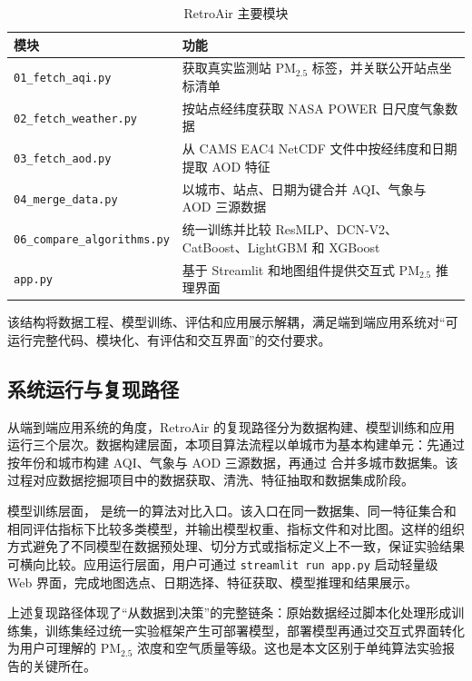 \documentclass[UTF8,zihao=-4,a4paper]{ctexart}
\newcommand{\pmfine}{PM$_{2.5}$}
\newcommand{\aod}{AOD}
\begin{document}
\begin{table}[H]
  \centering
  \caption{RetroAir 主要模块}
  \label{tab:modules}
  \begin{tabularx}{\textwidth}{lX}
    \toprule
    模块 & 功能 \\
    \midrule
    \texttt{01\_fetch\_aqi.py} & 获取真实监测站 \pmfine{} 标签，并关联公开站点坐标清单 \\
    \texttt{02\_fetch\_weather.py} & 按站点经纬度获取 NASA POWER 日尺度气象数据 \\
    \texttt{03\_fetch\_aod.py} & 从 CAMS EAC4 NetCDF 文件中按经纬度和日期提取 \aod{} 特征 \\
    \texttt{04\_merge\_data.py} & 以城市、站点、日期为键合并 AQI、气象与 \aod{} 三源数据 \\
    \texttt{06\_compare\_algorithms.py} & 统一训练并比较 ResMLP、DCN-V2、CatBoost、LightGBM 和 XGBoost \\
    \texttt{app.py} & 基于 Streamlit 和地图组件提供交互式 \pmfine{} 推理界面 \\
    \bottomrule
  \end{tabularx}
\end{table}

该结构将数据工程、模型训练、评估和应用展示解耦，满足端到端应用系统对“可运行完整代码、模块化、有评估和交互界面”的交付要求。

\subsection{系统运行与复现路径}

从端到端应用系统的角度，RetroAir 的复现路径分为数据构建、模型训练和应用运行三个层次。数据构建层面，本项目算法流程以单城市为基本构建单元：先通过  按年份和城市构建 AQI、气象与 \aod{} 三源数据，再通过  合并多城市数据集。该过程对应数据挖掘项目中的数据获取、清洗、特征抽取和数据集成阶段。

模型训练层面， 是统一的算法对比入口。该入口在同一数据集、同一特征集合和相同评估指标下比较多类模型，并输出模型权重、指标文件和对比图。这样的组织方式避免了不同模型在数据预处理、切分方式或指标定义上不一致，保证实验结果可横向比较。应用运行层面，用户可通过 \texttt{streamlit run app.py} 启动轻量级 Web 界面，完成地图选点、日期选择、特征获取、模型推理和结果展示。

上述复现路径体现了“从数据到决策”的完整链条：原始数据经过脚本化处理形成训练集，训练集经过统一实验框架产生可部署模型，部署模型再通过交互式界面转化为用户可理解的 \pmfine{} 浓度和空气质量等级。这也是本文区别于单纯算法实验报告的关键所在。
\end{document}
